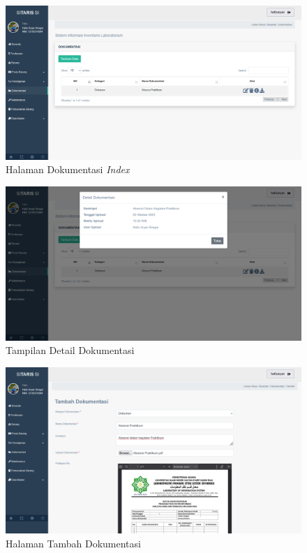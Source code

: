 \begin{enumerate}
        \begin{figure}
          \centering
          \includegraphics[width=0.82\linewidth]{konten//gambar/dokumentasi index.png}
          \caption{Halaman Dokumentasi \textit{Index}}
          \label{fig:enter-label}
        \end{figure}

        \begin{figure}
          \centering
          \includegraphics[width=0.82\linewidth]{konten//gambar/dokumentasi detail.png}
          \caption{Tampilan Detail Dokumentasi}
          \label{fig:enter-label}
        \end{figure}

        \begin{figure}
          \centering
          \includegraphics[width=0.82\linewidth]{konten//gambar/dokumentasi tambah.png}
          \caption{Halaman Tambah Dokumentasi}
          \label{fig:enter-label}
        \end{figure}


\end{enumerate}
